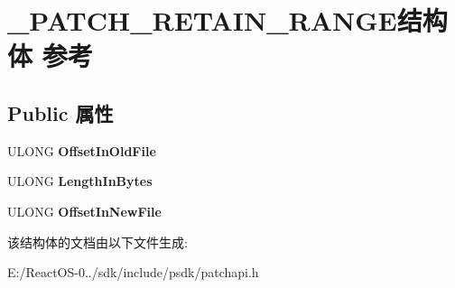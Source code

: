 \hypertarget{struct___p_a_t_c_h___r_e_t_a_i_n___r_a_n_g_e}{}\section{\+\_\+\+P\+A\+T\+C\+H\+\_\+\+R\+E\+T\+A\+I\+N\+\_\+\+R\+A\+N\+G\+E结构体 参考}
\label{struct___p_a_t_c_h___r_e_t_a_i_n___r_a_n_g_e}
\subsection*{Public 属性}
\begin{DoxyCompactItemize}
\item 
\mbox{\label{struct___p_a_t_c_h___r_e_t_a_i_n___r_a_n_g_e_afbba8839cb58f0ed61331054b5eff33d}} 
U\+L\+O\+NG {\bfseries Offset\+In\+Old\+File}
\item 
\mbox{\label{struct___p_a_t_c_h___r_e_t_a_i_n___r_a_n_g_e_a6974c71f59e951a03824ea022f4a185d}} 
U\+L\+O\+NG {\bfseries Length\+In\+Bytes}
\item 
\mbox{\label{struct___p_a_t_c_h___r_e_t_a_i_n___r_a_n_g_e_a4a23954fa51797e56b3b12384d93752f}} 
U\+L\+O\+NG {\bfseries Offset\+In\+New\+File}
\end{DoxyCompactItemize}


该结构体的文档由以下文件生成\+:\begin{DoxyCompactItemize}
\item 
E\+:/\+React\+O\+S-\/0../sdk/include/psdk/patchapi.\+h\end{DoxyCompactItemize}
